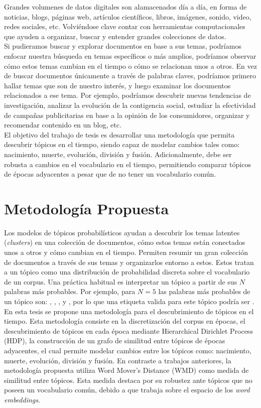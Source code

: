 Grandes volumenes de datos digitales son alamacenados día a día, en forma de noticias, blogs, páginas web, artículos científicos, libros, imágenes, sonido, video, redes sociales, etc. Volviéndose clave contar con herramientas computacionales que ayuden a organizar, buscar y entender grandes colecciones de datos. \\

Si pudieramos buscar y explorar documentos en base a sus temas, podríamos enfocar nuestra búsqueda en temas específicos o más amplios, podríamos observar cómo estos temas cambian en el tiempo o cómo se relacionan unos a otros. En vez de buscar documentos únicamente a través de palabras claves, podríamos primero hallar temas que son de nuestro interés, y luego examinar los documentos relacionados a ese tema. Por ejemplo, podríamos descubrir nuevas tendencias de investigación, analizar la evolución de la contigencia social, estudiar la efectividad de campañas publicitarias en base a la opinión de los consumidores, organizar y recomendar contenido en un blog, etc.\\

El objetivo del trabajo de tesis es desarrollar una metodología que permita descubrir tópicos en el tiempo, siendo capaz de modelar cambios tales como: nacimiento, muerte, evolución, división y fusión. Adicionalmente, debe ser robusta a cambios en el vocabulario en el tiempo, permitiendo comparar tópicos de épocas adyacentes a pesar que de no tener un vocabulario común.

\section{Metodología Propuesta}
Los modelos de tópicos probabilísticos ayudan a descubrir los temas latentes (\textit{clusters}) en una colección de documentos, cómo estos temas están conectados unos a otros y cómo cambian en el tiempo. Permiten resumir un gran colección de documentos a través de sus temas y organizarlos entorno a estos. Estos tratan a un tópico como una distribución de probabilidad discreta sobre el vocabulario de un corpus. Una práctica habitual es interpretar un tópico a partir de sus $N$ palabras más probables. Por ejemplo, para $N=5$ las palabras más probables de un tópico son: , , ,  y , por lo que una etiqueta valida para este tópico podría ser .\\ 

En esta tesis se propone una metodología para el descubrimiento de tópicos en el tiempo. Esta metodología consiste en la discretización del corpus en épocas, el descubrimiento de tópicos en cada época mediante Hierarchical Dirichlet Process (HDP), la construcción de un grafo de similitud entre tópicos de épocas adyacentes, el cual permite modelar cambios entre los tópicos como: nacimiento, muerte, evolución, división y fusión. En contraste a trabajos anteriores, la metodología propuesta utiliza Word Mover's Distance (WMD) como medida de similitud entre tópicos. Esta medida destaca por su robustez ante tópicos que no poseen un vocabulario común, debido a que trabaja sobre el espacio de los \textit{word embeddings}.\\

